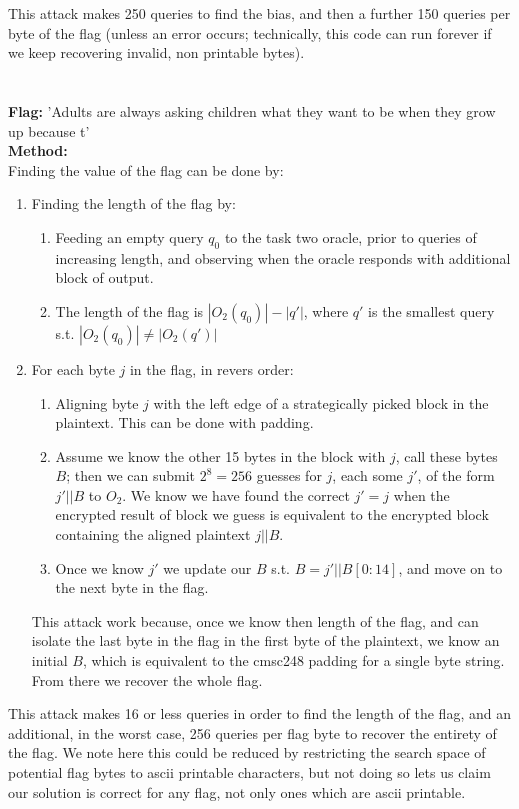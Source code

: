 \documentclass[]{article}
\begin{document}
This attack makes 250 queries to find the bias, and then a further 150 queries per byte of the flag (unless an error occurs; technically, this code can run forever if we keep recovering invalid, non printable bytes).

\section{}
\textbf{Flag:} 'Adults are always asking children what they want to be when they grow up because t'
\\
\textbf{Method:}
\\
Finding the value of the flag can be done by:
\begin{enumerate}
	\item Finding the length of the flag by:
	\begin{enumerate}
		\item Feeding an empty query $q_0$ to the task two oracle, prior to queries of increasing length, and observing when the oracle responds with additional block of output.
		\item The length of the flag is $|O_2(q_0)| - |q'|$, where $q'$ is the smallest query s.t. $|O_2(q_0)| \neq |O_2(q')|$
	\end{enumerate}
	\item For each byte $j$ in the flag, in revers order:
	\begin{enumerate}
		\item Aligning byte $j$ with the left edge of a strategically picked block in the plaintext. This can be done with padding.
		\item Assume we know the other 15 bytes in the block with $j$, call these bytes $B$; then we can submit $2^{8} = 256$ guesses for $j$, each some $j'$, of the form $j' || B$ to $O_2$. We know we have found the correct $j' = j$ when the encrypted result of block we guess is equivalent to the encrypted block containing the aligned plaintext $j || B$.
		\item Once we know $j'$ we update our $B$ s.t. $B = j' || B[0:14]$, and move on to the next byte in the flag.
	\end{enumerate}
	This attack work because, once we know then length of the flag, and can isolate the last byte in the flag in the first byte of the plaintext, we know an initial $B$, which is equivalent to the cmsc248 padding for a single byte string. From there we recover the whole flag.
\end{enumerate}

This attack makes 16 or less queries in order to find the length of the flag, and an additional, in the worst case, 256 queries per flag byte to recover the entirety of the flag. We note here this could be reduced by restricting the search space of potential flag bytes to ascii printable characters, but not doing so lets us claim our solution is correct for any flag, not only ones which are ascii printable.
\end{document}
